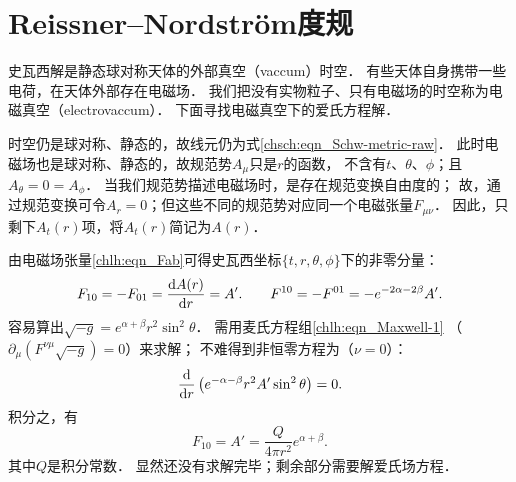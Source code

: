\section{Reissner--Nordstr\"om度规}
史瓦西解是静态球对称天体的外部真空（vaccum）时空．
有些天体自身携带一些电荷，在天体外部存在电磁场．
我们把没有实物粒子、只有电磁场的时空称为{\heiti 电磁真空}（electrovaccum）．
下面寻找电磁真空下的爱氏方程解．

时空仍是球对称、静态的，故线元仍为式\eqref{chsch:eqn_Schw-metric-raw}．
此时电磁场也是球对称、静态的，故规范势$A_\mu$只是$r$的函数，
不含有$t$、$\theta$、$\phi$；且$A_\theta=0=A_\phi$．
当我们规范势描述电磁场时，是存在规范变换自由度的；
故，通过规范变换可令$A_r=0$；但这些不同的规范势对应同一个电磁张量$F_{\mu\nu}$．
因此，只剩下$A_t(r)$项，将$A_t(r)$简记为$A(r)$．

由电磁场张量\eqref{chlh:eqn_Fab}可得史瓦西坐标$\{t,r,\theta,\phi\}$下的非零分量：
\begin{equation}
    F_{10}=-F_{01}= \frac{{\rm d}A(r)}{{\rm d}r} = A' . \qquad
    F^{10}=-F^{01}=-e^{-2\alpha-2\beta}A' .
\end{equation}
容易算出$\sqrt{-g}=e^{\alpha+\beta}r^2 \sin^2\theta$．
需用麦氏方程组\eqref{chlh:eqn_Maxwell-1}
（$\partial_\mu \left(F^{\nu\mu} \sqrt{-g} \right) = 0$）来求解；
不难得到非恒零方程为（$\nu=0$）：
\begin{equation}
    \frac{{\rm d}}{{\rm d}r} \left( e^{-\alpha-\beta} r^2 A' \sin^2\theta \right) =0.
\end{equation}
积分之，有
\begin{equation}
    F_{10}= A' = \frac{Q}{4\pi r^2} e^{\alpha+\beta}.
\end{equation}
其中$Q$是积分常数．
显然还没有求解完毕；剩余部分需要解爱氏场方程．



